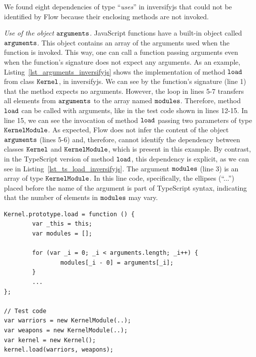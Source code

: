 \documentclass[review]{elsarticle}
\newcommand{\aspas}[1]{{``#1''}}
\newcommand{\mcode}[1]{$\tt #1$}
\begin{document}
We found eight dependencies of type \aspas{\textit{uses}} in {\sc inversifyjs} that could not be identified by Flow because their enclosing methods are not invoked. 

\vspace{0.3cm}

\noindent \textit{Use of the object \mcode{arguments}.} JavaScript functions have a built-in object called \mcode{arguments}. This object contains an array of the arguments used when the function is invoked. This way, one can call a function passing arguments even when the function's signature does not expect any arguments. As an example, Listing~\ref{lst_arguments_inversifyjs} shows the implementation of method \mcode{load} from class \mcode{Kernel}, in {\sc inversifyjs}. We can see by the function's signature (line 1) that the method expects no arguments. However, the loop in lines 5-7 transfers all elements from \mcode{arguments} to the array named \mcode{modules}. Therefore, method \mcode{load} can be called with arguments, like in the test code shown in lines 12-15. In line 15, we can see the invocation of method \mcode{load} passing two parameters of type \mcode{KernelModule}. As expected, Flow does not infer the content of the object \mcode{arguments} (lines 5-6) and, therefore, cannot identify the dependency between classes \mcode{Kernel} and \mcode{KernelModule}, which is present in this example. By contrast, in the TypeScript version of method \mcode{load}, this dependency is explicit, as we can see in Listing~\ref{lst_ts_load_inversifyjs}. The argument \mcode{modules} (line 3) is an array of type \mcode{KernelModule}. In this line code, specifically, the ellipses (\aspas{...}) placed before the name of the argument is part of TypeScript syntax, indicating that the number of elements in \mcode{modules} may vary.

\vspace{0.07cm}

\begin{lstlisting}[caption=Example of method that uses the built-in object \mcode{arguments}, label=lst_arguments_inversifyjs, emph={[2]arguments},emphstyle={[2]\ttfamily\bfseries\color{darkgreen}}, emph={[3]_bindingDictionary},emphstyle={[3]\ttfamily\bfseries\color{purple}}]
Kernel.prototype.load = function () {
		var _this = this;
		var modules = [];

		for (var _i = 0; _i < arguments.length; _i++) {
				modules[_i - 0] = arguments[_i];
		}
		...
};

// Test code
var warriors = new KernelModule(..);
var weapons = new KernelModule(..);
var kernel = new Kernel();
kernel.load(warriors, weapons);

\end{lstlisting} 
\end{document}

